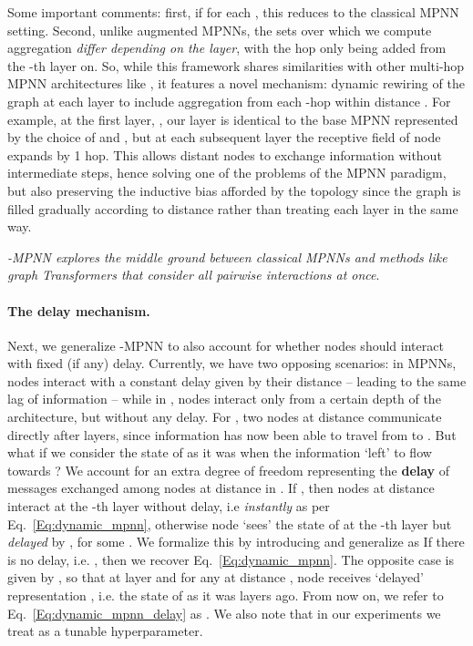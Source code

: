 \documentclass{article}
\theoremstyle{plain}
\theoremstyle{definition}
\theoremstyle{remark}
\begin{document}
\noindent Some important comments: first, if  for each , this reduces to the classical MPNN setting. Second, unlike augmented MPNNs, the sets over which we compute aggregation {\em differ depending on the layer}, with the hop  only being added from the -th layer on. So, while this framework shares similarities with other multi-hop MPNN architectures like \citet{abboud2022shortest}, it features a novel mechanism: dynamic rewiring of the graph at each layer  to include aggregation from each -hop within distance . For example, at the first layer, , our  layer is identical to the base MPNN represented by the choice of  and , but at each subsequent layer the receptive field of node  expands by 1 hop. This allows distant nodes to exchange information without intermediate steps, hence solving one of the problems of the MPNN paradigm, but also preserving the inductive bias afforded by the topology since the graph is filled gradually according to distance rather than treating each layer in the same way. 


{\em -MPNN explores the middle ground between classical MPNNs
and methods like graph Transformers that consider all pairwise interactions at once}. 




\paragraph{The delay mechanism.}
Next, we generalize -MPNN to also account for  whether nodes should interact with fixed (if any) delay. Currently, we have two opposing scenarios: in MPNNs, nodes interact with a constant delay given by their distance -- leading to the same lag of information -- while in , nodes interact only from a certain depth of the architecture, but without any delay. For , two nodes  at distance  communicate directly after  layers, since information has now been able to travel from  to .
But what if we consider the state of  as it was when the information `left' to flow towards ?
We account for an extra degree of freedom  representing the \textbf{delay} of messages exchanged among nodes at distance  in . If , then nodes at distance  interact at the -th layer without delay,
i.e {\em instantly} as per Eq.~\eqref{Eq:dynamic_mpnn},
otherwise node  `sees' the state of  at the -th layer but \emph{delayed} by , for some . We formalize this by introducing
 and generalize  as 
\noindent If there is no delay, i.e. ,
then we recover Eq.~\eqref{Eq:dynamic_mpnn}.
The opposite case is given by , so that at layer  and for any  at distance , node  receives `delayed' representation , i.e. the state of  as it was  layers ago.
From now on, we refer to Eq.~\eqref{Eq:dynamic_mpnn_delay} as . We also note that in our experiments we treat  as a tunable hyperparameter. 
\end{document}
